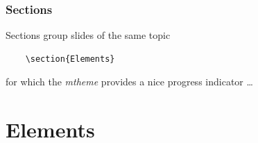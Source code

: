 \documentclass[10pt, compress]{beamer}
\begin{document}
\begin{frame}[fragile]
  \frametitle{Sections}
  Sections group slides of the same topic

  \begin{verbatim}
    \section{Elements}
  \end{verbatim}

  for which the \emph{mtheme} provides a nice progress indicator \ldots
\end{frame}

\section{Elements}
\end{document}
